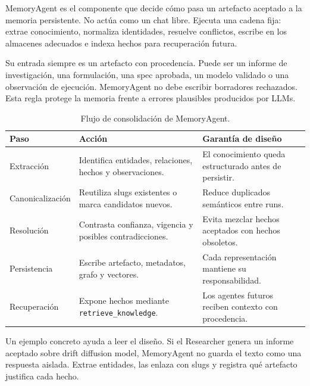 MemoryAgent es el componente que decide cómo pasa un artefacto aceptado a la
memoria persistente. No actúa como un chat libre. Ejecuta una cadena fija:
extrae conocimiento, normaliza identidades, resuelve conflictos, escribe en los
almacenes adecuados e indexa hechos para recuperación futura.

Su entrada siempre es un artefacto con procedencia. Puede ser un informe de
investigación, una formulación, una spec aprobada, un modelo validado o una
observación de ejecución. MemoryAgent no debe escribir borradores rechazados.
Esta regla protege la memoria frente a errores plausibles producidos por LLMs.

\begin{table}[H]
\begin{center}
\small
\begin{tabular}{|p{3.0cm}|p{4.9cm}|p{4.6cm}|} \hline
\textbf{Paso} & \textbf{Acción} & \textbf{Garantía de diseño} \\ \hline
Extracción & Identifica entidades, relaciones, hechos y observaciones. & El conocimiento queda estructurado antes de persistir. \\ \hline
Canonicalización & Reutiliza slugs existentes o marca candidatos nuevos. & Reduce duplicados semánticos entre runs. \\ \hline
Resolución & Contrasta confianza, vigencia y posibles contradicciones. & Evita mezclar hechos aceptados con hechos obsoletos. \\ \hline
Persistencia & Escribe artefacto, metadatos, grafo y vectores. & Cada representación mantiene su responsabilidad. \\ \hline
Recuperación & Expone hechos mediante \texttt{retrieve\_knowledge}. & Los agentes futuros reciben contexto con procedencia. \\ \hline
\end{tabular}
\caption{Flujo de consolidación de MemoryAgent.}
\end{center}
\end{table}

Un ejemplo concreto ayuda a leer el diseño. Si el Researcher genera un informe
aceptado sobre drift diffusion model, MemoryAgent no guarda el texto como una
respuesta aislada. Extrae entidades, las enlaza con slugs y registra qué artefacto
justifica cada hecho.

